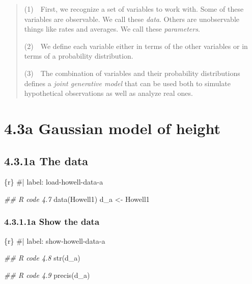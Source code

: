 \documentclass[
  letterpaper,
  DIV=11,
  numbers=noendperiod]{scrreprt}
\newenvironment{Shaded}{\begin{snugshade}}{\end{snugshade}}
\newcommand{\CommentTok}[1]{\textcolor[rgb]{0.37,0.37,0.37}{#1}}
\newcommand{\DocumentationTok}[1]{\textcolor[rgb]{0.37,0.37,0.37}{\textit{#1}}}
\newcommand{\FunctionTok}[1]{\textcolor[rgb]{0.28,0.35,0.67}{#1}}
\newcommand{\InformationTok}[1]{\textcolor[rgb]{0.37,0.37,0.37}{#1}}
\newcommand{\NormalTok}[1]{\textcolor[rgb]{0.00,0.23,0.31}{#1}}
\newcommand{\OtherTok}[1]{\textcolor[rgb]{0.00,0.23,0.31}{#1}}
\begin{document}
\begin{quote}
(1)~~First, we recognize a set of variables to work with. Some of these
variables are observable. We call these \emph{data}. Others are
unobservable things like rates and averages. We call these
\emph{parameters}.

(2)~~We define each variable either in terms of the other variables or
in terms of a probability distribution.

(3)~~The combination of variables and their probability distributions
defines a \emph{joint generative model} that can be used both to
simulate hypothetical observations as well as analyze real ones.
\end{quote}

\hypertarget{a-gaussian-model-of-height}{%
\section{4.3a Gaussian model of
height}\label{a-gaussian-model-of-height}}

\hypertarget{a-the-data}{%
\subsection{4.3.1a The data}\label{a-the-data}}

\begin{Shaded}
\begin{Highlighting}[]
\InformationTok{\textasciigrave{}\textasciigrave{}\textasciigrave{}\{r\}}
\CommentTok{\#| label: load{-}howell{-}data{-}a}

\DocumentationTok{\#\# R code 4.7}
\FunctionTok{data}\NormalTok{(Howell1)}
\NormalTok{d\_a }\OtherTok{\textless{}{-}}\NormalTok{ Howell1}
\InformationTok{\textasciigrave{}\textasciigrave{}\textasciigrave{}}
\end{Highlighting}
\end{Shaded}

\hypertarget{a-show-the-data}{%
\subsubsection{4.3.1.1a Show the data}\label{a-show-the-data}}

\begin{Shaded}
\begin{Highlighting}[]
\InformationTok{\textasciigrave{}\textasciigrave{}\textasciigrave{}\{r\}}
\CommentTok{\#| label: show{-}howell{-}data{-}a}

\DocumentationTok{\#\# R code 4.8}
\FunctionTok{str}\NormalTok{(d\_a)}

\DocumentationTok{\#\# R code 4.9}
\FunctionTok{precis}\NormalTok{(d\_a)}
\InformationTok{\textasciigrave{}\textasciigrave{}\textasciigrave{}}
\end{Highlighting}
\end{Shaded}
\end{document}
